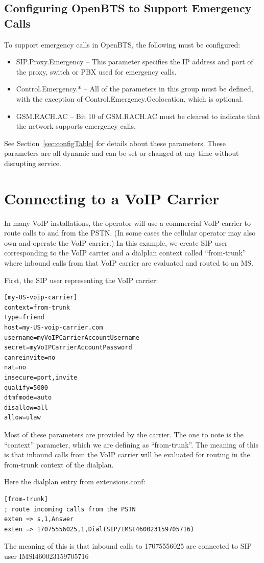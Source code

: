 \documentclass[11pt,openany]{book}
\begin{document}
\subsection{Configuring OpenBTS to Support Emergency Calls}
To support emergency calls in OpenBTS, the following must be configured:
\begin{itemize}
	\item SIP.Proxy.Emergency -- This parameter specifies the IP address and port of the proxy, switch or PBX used for emergency calls.
	\item Control.Emergency.* -- All of the parameters in this group must be defined, with the exception of Control.Emergency.Geolocation, which is optional.
	\item GSM.RACH.AC -- Bit 10 of GSM.RACH.AC must be cleared to indicate that the network supports emergency calls. 
\end{itemize}
See Section~\ref{sec:configTable} for details about these parameters.
These parameters are all dynamic and can be set or changed at any time without disrupting service.


\section{Connecting to a VoIP Carrier}
In many VoIP installations, the operator will use a commercial VoIP carrier to route calls to and from the PSTN.
(In some cases the cellular operator may also own and operate the VoIP carrier.)
In this example, we create SIP user corresponding to the VoIP carrier and a dialplan context called ``from-trunk'' where inbound calls from that VoIP carrier are evaluated and routed to an MS.

First, the SIP user representing the VoIP carrier:
\begin{verbatim}
[my-US-voip-carrier]
context=from-trunk
type=friend
host=my-US-voip-carrier.com
username=myVoIPCarrierAccountUsername
secret=myVoIPCarrierAccountPassword
canreinvite=no
nat=no
insecure=port,invite
qualify=5000
dtmfmode=auto
disallow=all
allow=ulaw
\end{verbatim}
Most of these parameters are provided by the carrier.  The one to note is the ``context'' parameter, which we are defining as ``from-trunk''.  The meaning of this is that inbound calls from the VoIP carrier will be evaluated for routing in the from-trunk context of the dialplan.

Here the dialplan entry from extensions.conf:
\begin{verbatim}
[from-trunk]
; route incoming calls from the PSTN
exten => s,1,Answer
exten => 17075556025,1,Dial(SIP/IMSI460023159705716)
\end{verbatim}
The meaning of this is that inbound calls to 17075556025 are connected to SIP user IMSI460023159705716
\end{document}
